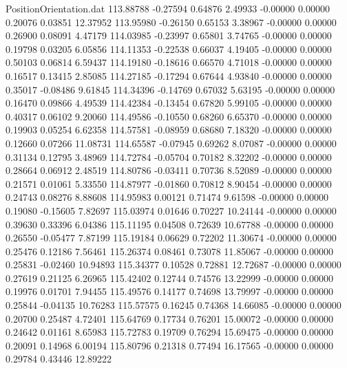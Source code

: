 \begin{filecontents}{PositionOrientation.dat}
 113.88788   -0.27594    0.64876     2.49933   -0.00000    0.00000    0.20076    0.03851   12.37952
 113.95980   -0.26150    0.65153     3.38967   -0.00000    0.00000    0.26900    0.08091    4.47179
 114.03985   -0.23997    0.65801     3.74765   -0.00000    0.00000    0.19798    0.03205    6.05856
 114.11353   -0.22538    0.66037     4.19405   -0.00000    0.00000    0.50103    0.06814    6.59437
 114.19180   -0.18616    0.66570     4.71018   -0.00000    0.00000    0.16517    0.13415    2.85085
 114.27185   -0.17294    0.67644     4.93840   -0.00000    0.00000    0.35017   -0.08486    9.61845
 114.34396   -0.14769    0.67032     5.63195   -0.00000    0.00000    0.16470    0.09866    4.49539
 114.42384   -0.13454    0.67820     5.99105   -0.00000    0.00000    0.40317    0.06102    9.20060
 114.49586   -0.10550    0.68260     6.65370   -0.00000    0.00000    0.19903    0.05254    6.62358
 114.57581   -0.08959    0.68680     7.18320   -0.00000    0.00000    0.12660    0.07266   11.08731
 114.65587   -0.07945    0.69262     8.07087   -0.00000    0.00000    0.31134    0.12795    3.48969
 114.72784   -0.05704    0.70182     8.32202   -0.00000    0.00000    0.28664    0.06912    2.48519
 114.80786   -0.03411    0.70736     8.52089   -0.00000    0.00000    0.21571    0.01061    5.33550
 114.87977   -0.01860    0.70812     8.90454   -0.00000    0.00000    0.24743    0.08276    8.88608
 114.95983    0.00121    0.71474     9.61598   -0.00000    0.00000    0.19080   -0.15605    7.82697
 115.03974    0.01646    0.70227    10.24144   -0.00000    0.00000    0.39630    0.33396    6.04386
 115.11195    0.04508    0.72639    10.67788   -0.00000    0.00000    0.26550   -0.05477    7.87199
 115.19184    0.06629    0.72202    11.30674   -0.00000    0.00000    0.25476    0.12186    7.56461
 115.26374    0.08461    0.73078    11.85067   -0.00000    0.00000    0.25831   -0.02460   10.94893
 115.34377    0.10528    0.72881    12.72687   -0.00000    0.00000    0.27619    0.21125    6.26965
 115.42402    0.12744    0.74576    13.22999   -0.00000    0.00000    0.19976    0.01701    7.94455
 115.49576    0.14177    0.74698    13.79997   -0.00000    0.00000    0.25844   -0.04135   10.76283
 115.57575    0.16245    0.74368    14.66085   -0.00000    0.00000    0.20700    0.25487    4.72401
 115.64769    0.17734    0.76201    15.00072   -0.00000    0.00000    0.24642    0.01161    8.65983
 115.72783    0.19709    0.76294    15.69475   -0.00000    0.00000    0.20091    0.14968    6.00194
 115.80796    0.21318    0.77494    16.17565   -0.00000    0.00000    0.29784    0.43446   12.89222

\end{filecontents}
